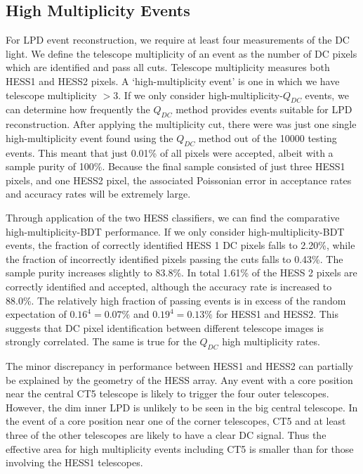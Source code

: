\documentclass[11pt]{article}
\begin{document}
\subsection{High Multiplicity Events}
For LPD event reconstruction, we require at least four measurements of the DC light. We define the telescope multiplicity of an event as the number of DC pixels which are identified and pass all cuts. Telescope multiplicity measures both HESS1 and HESS2 pixels. A \textquoteleft high-multiplicity event' is one in which we have telescope multiplicity $>3$. If we only consider high-multiplicity-$Q_{DC}$ events, we can determine how frequently the $Q_{DC}$ method provides events suitable for LPD reconstruction. After applying the multiplicity cut, there were was just one single high-multiplicity event found using the $Q_{DC}$ method out of the 10000 testing events. This meant that just 0.01\% of all pixels were accepted, albeit with a sample purity of 100\%. Because the final sample consisted of just three HESS1 pixels, and one HESS2 pixel, the associated Poissonian error in acceptance rates and accuracy rates will be extremely large.

Through application of the two HESS classifiers, we can find the comparative high-multiplicity-BDT performance. If we only consider high-multiplicity-BDT events, the fraction of correctly identified HESS 1 DC pixels falls to 2.20\%, while the fraction of incorrectly identified pixels passing the cuts falls to 0.43\%. The sample purity increases slightly to 83.8\%.  In total 1.61\% of the HESS 2 pixels are correctly identified and accepted, although the accuracy rate is increased to 88.0\%. The relatively high fraction of passing events is in excess of the random expectation of $0.16^{4}=0.07\%$ and $0.19^{4}=0.13\%$ for HESS1 and HESS2. This suggests that DC pixel identification between different telescope images is strongly correlated. The same is true for the $Q_{DC}$ high multiplicity rates. 

The minor discrepancy in performance between HESS1 and HESS2 can partially be explained by the geometry of the HESS array. Any event  with a core position near the central CT5 telescope is likely to trigger the four outer telescopes. However, the dim inner LPD is unlikely to be seen in the big central telescope. In the event of a core position near one of the corner telescopes, CT5 and at least three of the other telescopes are likely to have a clear DC signal. Thus the effective area for high multiplicity events including CT5 is smaller than for those involving the HESS1 telescopes.
\end{document}
